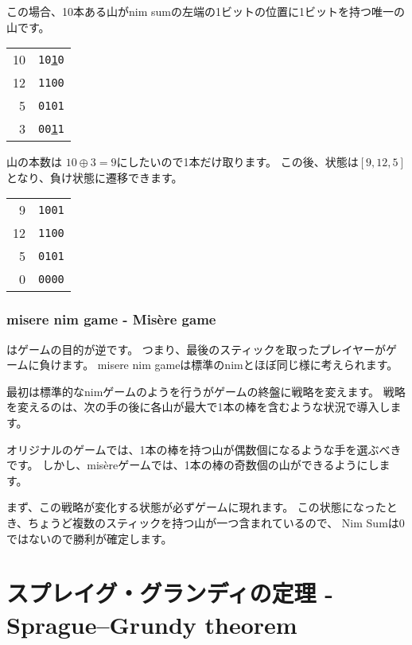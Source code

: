 この場合、10本ある山がnim sumの左端の1ビットの位置に1ビットを持つ唯一の山です。

\begin{center}
\begin{tabular}{r|r}
10 & \texttt{10\underline{1}0} \\
12 & \texttt{1100} \\
5 & \texttt{0101} \\
\hline
3 & \texttt{00\underline{1}1} \\
\end{tabular}
\end{center}

山の本数は $10 \oplus 3 = 9$にしたいので1本だけ取ります。
この後、状態は$[9, 12, 5]$となり、負け状態に遷移できます。

\begin{center}
\begin{tabular}{r|r}
9 & \texttt{1001} \\
12 & \texttt{1100} \\
5 & \texttt{0101} \\
\hline
0 & \texttt{0000} \\
\end{tabular}
\end{center}

\subsubsection{misere nim game - Misère game}


はゲームの目的が逆です。
つまり、最後のスティックを取ったプレイヤーがゲームに負けます。
misere nim gameは標準のnimとほぼ同じ様に考えられます。

最初は標準的なnimゲームのようを行うがゲームの終盤に戦略を変えます。
戦略を変えるのは、次の手の後に各山が最大で1本の棒を含むような状況で導入します。

オリジナルのゲームでは、1本の棒を持つ山が偶数個になるような手を選ぶべきです。
しかし、misèreゲームでは、1本の棒の奇数個の山ができるようにします。

まず、この戦略が変化する状態が必ずゲームに現れます。
この状態になったとき、ちょうど複数のスティックを持つ山が一つ含まれているので、
Nim Sumは0ではないので勝利が確定します。

\section{スプレイグ・グランディの定理 - Sprague–Grundy theorem}


